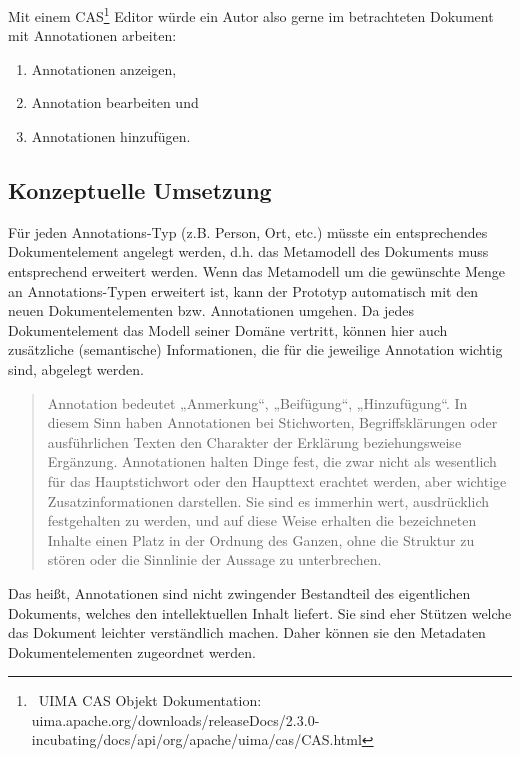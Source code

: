  
Mit einem CAS\footnote{~UIMA CAS Objekt Dokumentation: uima.apache.org/downloads/releaseDocs/2.3.0-incubating/docs/api/org/apache/uima/cas/CAS.html} Editor würde ein Autor also gerne im betrachteten Dokument mit Annotationen arbeiten:

 
\begin{enumerate}

\item Annotationen anzeigen,
\item Annotation bearbeiten und
\item Annotationen hinzufügen.
\end{enumerate}
 
\subsection{Konzeptuelle Umsetzung}\label{}
 
Für jeden Annotations-Typ (z.B. Person, Ort, etc.) müsste ein entsprechendes Dokumentelement angelegt werden, d.h. das Metamodell des Dokuments muss entsprechend erweitert werden. Wenn das Metamodell um die gewünschte Menge an Annotations-Typen erweitert ist, kann der Prototyp automatisch mit den neuen Dokumentelementen bzw. Annotationen umgehen. Da jedes Dokumentelement das Modell seiner Domäne vertritt, können hier auch zusätzliche (semantische) Informationen, die für die jeweilige Annotation wichtig sind, abgelegt werden.

 
\begin{quote}
 Annotation bedeutet „Anmerkung“, „Beifügung“, „Hinzufügung“. In diesem Sinn haben Annotationen bei Stichworten, Begriffsklärungen oder ausführlichen Texten den Charakter der Erklärung beziehungsweise Ergänzung. Annotationen halten Dinge fest, die zwar nicht als wesentlich für das Hauptstichwort oder den Haupttext erachtet werden, aber wichtige Zusatzinformationen darstellen. Sie sind es immerhin wert, ausdrücklich festgehalten zu werden, und auf diese Weise erhalten die bezeichneten Inhalte einen Platz in der Ordnung des Ganzen, ohne die Struktur zu stören oder die Sinnlinie der Aussage zu unterbrechen. \citep{WikiAnnotation}
\end{quote}
 
Das heißt, Annotationen sind nicht zwingender Bestandteil des eigentlichen Dokuments, welches den intellektuellen Inhalt liefert. Sie sind eher Stützen welche das Dokument leichter verständlich machen. Daher können sie den Metadaten Dokumentelementen zugeordnet werden.

